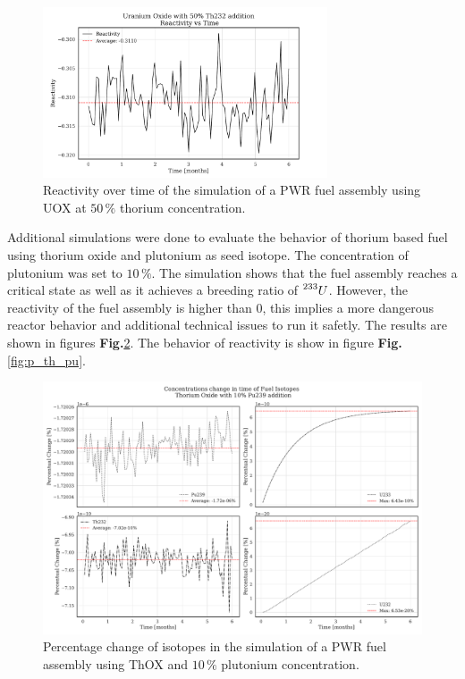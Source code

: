 \begin{figure}[ht]
    \centering
    \includegraphics[width=0.75\textwidth, scale = 0.5]{Kap7/Figures_Kap7/Reactivity_vs_Time_UOX_50.pdf}
    \caption{Reactivity over time of the simulation of a PWR fuel assembly using UOX at \(50 \, \%\) thorium concentration.}
    \label{fig:p_50}
\end{figure}

Additional simulations were done to evaluate the behavior of thorium based fuel using thorium oxide and plutonium as seed isotope. The concentration of plutonium was set to \(10 \, \%\). The simulation shows that the fuel assembly reaches a critical state as well as it achieves a breeding ratio of \(\prescript{233}{}{U}\). However, the reactivity of the fuel assembly is higher than \(0\), this implies a more dangerous reactor behavior and additional technical issues to run it safetly. The results are shown in figures \textbf{Fig.}\ref{fig:th_pu}. The behavior of reactivity is show in figure \textbf{Fig.} \ref{fig:p_th_pu}.   

\begin{figure}[ht]
    \centering
    \includegraphics[width=1\textwidth]{Kap7/Figures_Kap7/percentual_change_th232_Pu239.pdf}
    \caption{Percentage change of isotopes in the simulation of a PWR fuel assembly using ThOX and \(10 \, \%\) plutonium concentration.}
    \label{fig:th_pu}
\end{figure}  


